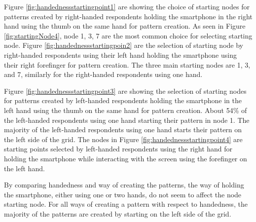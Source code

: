     Figure \ref{fig:handednessstartingpoint1} are showing the choice of starting nodes for patterns created by right-handed respondents holding the smartphone in the right hand using the thumb on the same hand for pattern creation. As seen in Figure \ref{fig:startingNode4}, node 1, 3, 7 are the most common choice for selecting starting node. Figure \ref{fig:handednessstartingpoin2} are the selection of starting node by right-handed respondents using their left hand holding the smartphone using their right forefinger for pattern creation. The three main starting nodes are 1, 3, and 7, similarly for the right-handed respondents using one hand. 

    Figure \ref{fig:handednessstartingpoint3} are showing the selection of starting nodes for patterns created by left-handed respondents holding the smartphone in the left hand using the thumb on the same hand for pattern creation. About 54\% of the left-handed respondents using one hand starting their pattern in node 1. The majority of the left-handed respondents using one hand starts their pattern on the left side of the grid. The nodes in Figure \ref{fig:handednessstartingpoint4} are starting points selected by left-handed respondents using the right hand for holding the smartphone while interacting with the screen using the forefinger on the left hand. 

    By comparing handedness and way of creating the patterns, the way of holding the smartphone, either using one or two hands, do not seem to affect the node starting node. For all ways of creating a pattern with respect to handedness, the majority of the patterns are created by starting on the left side of the grid.

      \clearpage

